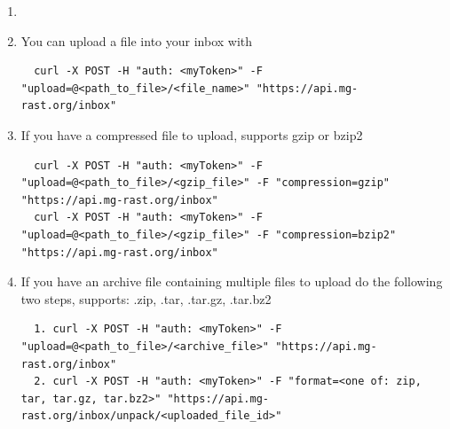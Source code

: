 \documentclass[12pt,fullpage]{report}
\begin{document}
\begin{enumerate}
\item
\item You can upload a file into your inbox with
\begin{small}
\begin{lstlisting}
  curl -X POST -H "auth: <myToken>" -F "upload=@<path_to_file>/<file_name>" "https://api.mg-rast.org/inbox"
\end{lstlisting}
\end{small}
\item If you have a compressed file to upload, supports gzip or bzip2
\begin{small}
\begin{lstlisting}
  curl -X POST -H "auth: <myToken>" -F "upload=@<path_to_file>/<gzip_file>" -F "compression=gzip" "https://api.mg-rast.org/inbox"
  curl -X POST -H "auth: <myToken>" -F "upload=@<path_to_file>/<gzip_file>" -F "compression=bzip2" "https://api.mg-rast.org/inbox"
\end{lstlisting}
\end{small}
\item If you have an archive file containing multiple files to upload do the following two steps, supports: .zip, .tar, .tar.gz, .tar.bz2
\begin{small}
\begin{lstlisting}
  1. curl -X POST -H "auth: <myToken>" -F "upload=@<path_to_file>/<archive_file>" "https://api.mg-rast.org/inbox"
  2. curl -X POST -H "auth: <myToken>" -F "format=<one of: zip, tar, tar.gz, tar.bz2>" "https://api.mg-rast.org/inbox/unpack/<uploaded_file_id>"
\end{lstlisting}
\end{small}
\end{enumerate}



\end{document}
